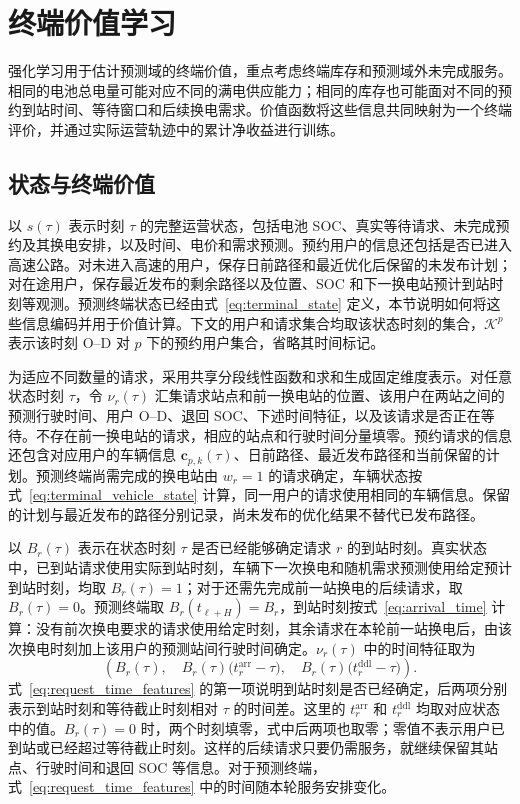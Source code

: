 \section{终端价值学习}
\label{sec:value}

强化学习用于估计预测域的终端价值，重点考虑终端库存和预测域外未完成服务。相同的电池总电量可能对应不同的满电供应能力；相同的库存也可能面对不同的预约到站时间、等待窗口和后续换电需求。价值函数将这些信息共同映射为一个终端评价，并通过实际运营轨迹中的累计净收益进行训练。

\subsection{状态与终端价值}
\label{sec:value_state}

以 $s(\tau)$ 表示时刻 $\tau$ 的完整运营状态，包括电池 SOC、真实等待请求、未完成预约及其换电安排，以及时间、电价和需求预测。预约用户的信息还包括是否已进入高速公路。对未进入高速的用户，保存日前路径和最近优化后保留的未发布计划；对在途用户，保存最近发布的剩余路径以及位置、SOC 和下一换电站预计到站时刻等观测。预测终端状态已经由式~\eqref{eq:terminal_state} 定义，本节说明如何将这些信息编码并用于价值计算。下文的用户和请求集合均取该状态时刻的集合，$\mathcal K^p$ 表示该时刻 O--D 对 $p$ 下的预约用户集合，省略其时间标记。

为适应不同数量的请求，采用共享分段线性函数和求和生成固定维度表示。对任意状态时刻 $\tau$，令 $\nu_r(\tau)$ 汇集请求站点和前一换电站的位置、该用户在两站之间的预测行驶时间、用户 O--D、退回 SOC、下述时间特征，以及该请求是否正在等待。不存在前一换电站的请求，相应的站点和行驶时间分量填零。预约请求的信息还包含对应用户的车辆信息 $\boldsymbol c_{p,k}(\tau)$、日前路径、最近发布路径和当前保留的计划。预测终端尚需完成的换电站由 $w_r=1$ 的请求确定，车辆状态按式~\eqref{eq:terminal_vehicle_state} 计算，同一用户的请求使用相同的车辆信息。保留的计划与最近发布的路径分别记录，尚未发布的优化结果不替代已发布路径。

以 $B_r(\tau)$ 表示在状态时刻 $\tau$ 是否已经能够确定请求 $r$ 的到站时刻。真实状态中，已到站请求使用实际到站时刻，车辆下一次换电和随机需求预测使用给定预计到站时刻，均取 $B_r(\tau)=1$；对于还需先完成前一站换电的后续请求，取 $B_r(\tau)=0$。预测终端取 $B_r(t_{\ell+H})=B_r$，到站时刻按式~\eqref{eq:arrival_time} 计算：没有前次换电要求的请求使用给定时刻，其余请求在本轮前一站换电后，由该次换电时刻加上该用户的预测站间行驶时间确定。$\nu_r(\tau)$ 中的时间特征取为
\begin{equation}
\left(B_r(\tau),\quad
B_r(\tau)\bigl(t_r^{\mathrm{arr}}-\tau\bigr),\quad
B_r(\tau)\bigl(t_r^{\mathrm{ddl}}-\tau\bigr)\right).
\label{eq:request_time_features}
\end{equation}
式~\eqref{eq:request_time_features} 的第一项说明到站时刻是否已经确定，后两项分别表示到站时刻和等待截止时刻相对 $\tau$ 的时间差。这里的 $t_r^{\mathrm{arr}}$ 和 $t_r^{\mathrm{ddl}}$ 均取对应状态中的值。$B_r(\tau)=0$ 时，两个时刻填零，式中后两项也取零；零值不表示用户已到站或已经超过等待截止时刻。这样的后续请求只要仍需服务，就继续保留其站点、行驶时间和退回 SOC 等信息。对于预测终端，式~\eqref{eq:request_time_features} 中的时间随本轮服务安排变化。


